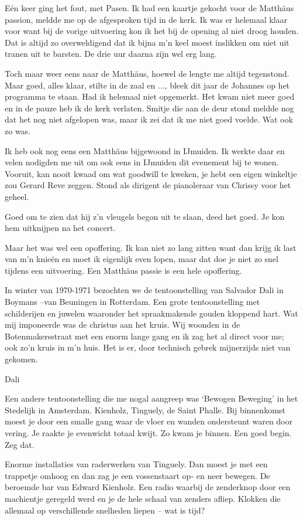 \documentclass[10pt,twoside,openright]{memoir}
\begin{document}
Eén keer ging het fout, met Pasen. Ik had een kaartje gekocht voor de Matthäus passion, meldde me op de afgesproken tijd in de kerk. Ik was er helemaal klaar voor want bij de vorige uitvoering kon ik het bij de opening al niet droog houden. Dat is altijd zo overweldigend dat ik bijna m’n keel moest inslikken om niet uit tranen uit te barsten. De drie uur daarna zijn wel erg lang. 

Toch maar weer eens naar de Matthäus, hoewel de lengte me altijd tegenstond. Maar goed, alles klaar, stilte in de zaal en ..., bleek dit jaar de Johannes op het programma te staan. Had ik helemaal niet opgemerkt. Het kwam niet meer goed en in de pauze heb ik de kerk verlaten. Smitje die aan de deur stond meldde nog dat het nog niet afgelopen was, maar ik zei dat ik me niet goed voelde. Wat ook zo was.

Ik heb ook nog eens een Matthäus bijgewoond in IJmuiden. Ik werkte daar en velen nodigden me uit om ook eens in IJmuiden dit evenement bij te wonen. Vooruit, kan nooit kwaad om wat goodwill te kweken, je hebt een eigen winkeltje zou Gerard Reve zeggen. Stond als dirigent de pianoleraar van Chrissy voor het geheel. 

Goed om te zien dat hij z’n vleugels begon uit te slaan, deed het goed. Je kon hem uitknijpen na het concert.  

Maar het was wel een opoffering. Ik kan niet zo lang zitten want dan krijg ik last van m’n knieën en moet ik eigenlijk even lopen, maar dat doe je niet zo snel tijdens een uitvoering. Een Matthäus passie is een hele opoffering.

In winter van 1970-1971 bezochten we de tentoonstelling van Salvador Dali in Boymans –van Beuningen in Rotterdam. Een grote tentoonstelling met schilderijen en juwelen waaronder het spraakmakende gouden kloppend hart. Wat mij imponeerde was de christus aan het kruis. Wij woonden in de Botenmakersstraat met een enorm lange gang en ik zag het al direct voor me; ook zo’n kruis in m’n huis. Het is er, door technisch gebrek mijnerzijds niet van gekomen.

Dali

Een andere tentoonstelling die me nogal aangreep was ‘Bewogen Beweging’ in het Stedelijk in Amsterdam. Kienholz, Tinguely, de Saint Phalle. Bij binnenkomst moest je door een smalle gang waar de vloer en wanden ondersteunt waren door vering. Je raakte je evenwicht totaal kwijt. Zo kwam je binnen. Een goed begin. Zeg dat.

Enorme installaties van raderwerken van Tinguely. Dan moest je met een trappetje omhoog en dan zag je een vossenstaart op- en neer bewegen. De beroemde bar van Edward Kienholz. Een radio waarbij de zenderknop door een machientje geregeld werd en je de hele schaal van zenders afliep. Klokken die allemaal op verschillende snelheden liepen – wat is tijd? 
\end{document}
